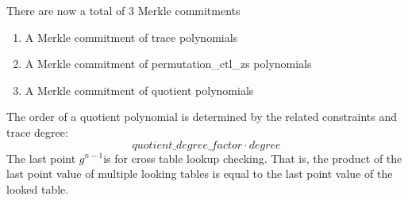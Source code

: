 \noindent There are now a total of 3 Merkle commitments

\begin{enumerate}
    \item A Merkle commitment of trace polynomials
    \item A Merkle commitment of permutation\_ctl\_zs polynomials
    \item A Merkle commitment of quotient polynomials
\end{enumerate}

\noindent The order of a quotient polynomial is determined by the related constraints and trace degree: $$quotient\_degree\_factor \cdot degree$$ The last point $ g^{n-1} $is for cross table lookup checking. That is, the product of the last point value of multiple looking tables is equal to the last point value of the looked table.
